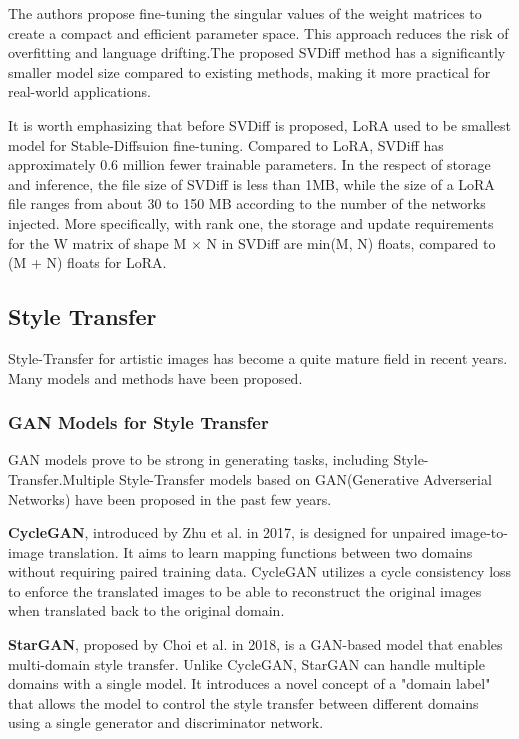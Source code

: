 \documentclass[conference]{IEEEtran}
\begin{document}
The authors propose fine-tuning the singular values of the weight matrices to create a compact and efficient parameter space. This approach reduces the risk of overfitting and language drifting.The proposed SVDiff method has a significantly smaller model size compared to existing methods, making it more practical for real-world applications.

It is worth emphasizing that before SVDiff is proposed, LoRA used to be smallest model for Stable-Diffsuion fine-tuning. Compared to LoRA, SVDiff has approximately 0.6 million fewer trainable parameters. In the respect of storage and inference, the file size of SVDiff is less than 1MB, while the size of a LoRA file ranges from about 30 to 150 MB according to the number of the networks injected. More specifically, with rank one, the storage and update requirements for the W matrix of shape M × N in SVDiff are min(M, N) floats, compared to (M + N) floats
for LoRA.

\subsection{Style Transfer}
Style-Transfer for artistic images has become a quite mature field in recent years. Many models and methods have been proposed. 

\subsubsection{GAN Models for Style Transfer} 
GAN models prove to be strong in generating tasks, including Style-Transfer.Multiple Style-Transfer models based on GAN(Generative Adverserial Networks) have been proposed in the past few years. 

\textbf{CycleGAN}\cite{cycle}, introduced by Zhu et al. in 2017, is designed for unpaired image-to-image translation. It aims to learn mapping functions between two domains without requiring paired training data. CycleGAN utilizes a cycle consistency loss to enforce the translated images to be able to reconstruct the original images when translated back to the original domain.

\textbf{StarGAN}\cite{star}, proposed by Choi et al. in 2018, is a GAN-based model that enables multi-domain style transfer. Unlike CycleGAN, StarGAN can handle multiple domains with a single model. It introduces a novel concept of a "domain label" that allows the model to control the style transfer between different domains using a single generator and discriminator network.
\end{document}
